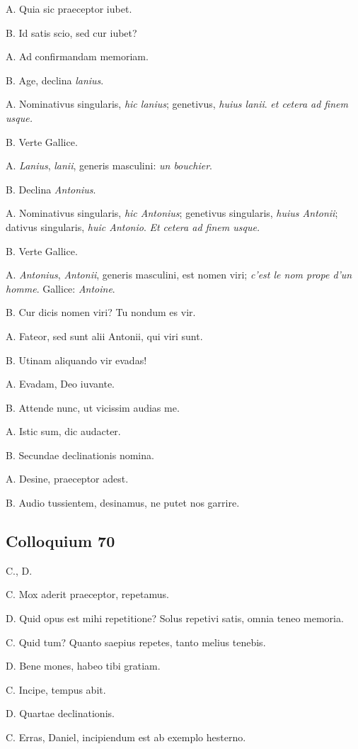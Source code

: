 \documentclass{article}
\newcommand{\fr}[1]{\foreignlanguage{french}{\emph{#1}}}
\begin{document}
A. Quia sic praeceptor iubet.

B. Id satis scio, sed cur iubet?

A. Ad confirmandam memoriam.

B. Age, declina \emph{lanius}.

A. Nominativus singularis, \emph{hic lanius}; genetivus, \emph{huius lanii}. \emph{et cetera ad finem usque.}

B. Verte Gallice.

A. \emph{Lanius}, \emph{lanii}, generis masculini: \fr{un bouchier}.

B. Declina \emph{Antonius}.

A. Nominativus singularis, \emph{hic Antonius}; genetivus singularis, \emph{huius Antonii}; dativus singularis, \emph{huic Antonio}. \emph{Et cetera ad finem usque.}

B. Verte Gallice.

A. \emph{Antonius}, \emph{Antonii}, generis masculini, est nomen viri; \fr{c'est le nom prope d'un homme}. Gallice: \fr{Antoine}.

B. Cur dicis nomen viri? Tu nondum es vir.

A. Fateor, sed sunt alii Antonii, qui viri sunt.

B. Utinam aliquando vir evadas!

A. Evadam, Deo iuvante.

B. Attende nunc, ut vicissim audias me.

A. Istic sum, dic audacter.

B. Secundae declinationis nomina.

A. Desine, praeceptor adest.

B. Audio tussientem, desinamus, ne putet nos garrire.

\subsection{Colloquium 70}
C., D.

C. Mox aderit praeceptor, repetamus.

D. Quid opus est mihi repetitione? Solus repetivi satis, omnia teneo memoria.

C. Quid tum? Quanto saepius repetes, tanto melius tenebis.

D. Bene mones, habeo tibi gratiam.

C. Incipe, tempus abit.

D. Quartae declinationis.

C. Erras, Daniel, incipiendum est ab exemplo hesterno.
\end{document}
